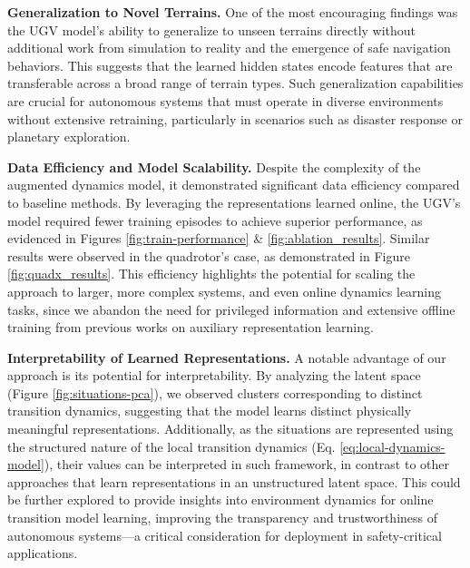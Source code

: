 \documentclass[Afour,sageh,times]{sagej}
\theoremstyle{lemma}
\begin{document}
\textbf{Generalization to Novel Terrains.}
One of the most encouraging findings was the UGV model's ability to generalize to unseen terrains directly without additional work from simulation to reality and the emergence of safe navigation behaviors. This suggests that the learned hidden states encode features that are transferable across a broad range of terrain types. Such generalization capabilities are crucial for autonomous systems that must operate in diverse environments without extensive retraining, particularly in scenarios such as disaster response or planetary exploration.

\textbf{Data Efficiency and Model Scalability.}
Despite the complexity of the augmented dynamics model, it demonstrated significant data efficiency compared to baseline methods. By leveraging the representations learned online, the UGV's model required fewer training episodes to achieve superior performance, as evidenced in Figures \ref{fig:train-performance} \& \ref{fig:ablation_results}. Similar results were observed in the quadrotor's case, as demonstrated in Figure \ref{fig:quadx_results}. This efficiency highlights the potential for scaling the approach to larger, more complex systems, and even online dynamics learning tasks, since we abandon the need for privileged information and extensive offline training from previous works on auxiliary representation learning.

\textbf{Interpretability of Learned Representations.}
A notable advantage of our approach is its potential for interpretability. By analyzing the latent space (Figure \ref{fig:situations-pca}), we observed clusters corresponding to distinct transition dynamics, suggesting that the model learns distinct physically meaningful representations. Additionally, as the situations are represented using the structured nature of the local transition dynamics (Eq. \ref{eq:local-dynamics-model}), their values can be interpreted in such framework, in contrast to other approaches that learn representations in an unstructured latent space. This could be further explored to provide insights into environment dynamics for online transition model learning, improving the transparency and trustworthiness of autonomous systems—a critical consideration for deployment in safety-critical applications.
\end{document}
